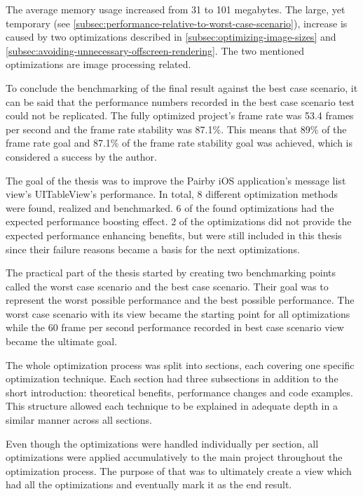 \documentclass[a4paper,12pt]{article}
\begin{document}
The average memory usage increased from 31 to 101 megabytes. The large, yet temporary (see \autoref{subsec:performance-relative-to-worst-case-scenario}), increase is caused by two optimizations described in \autoref{subsec:optimizing-image-sizes} and \autoref{subsec:avoiding-unnecessary-offscreen-rendering}. The two mentioned optimizations are image processing related.

To conclude the benchmarking of the final result against the best case scenario, it can be said that the performance numbers recorded in the best case scenario test could not be replicated. The fully optimized project's frame rate was 53.4 frames per second and the frame rate stability was 87.1\%. This means that 89\% of the frame rate goal and 87.1\% of the frame rate stability goal was achieved, which is considered a success by the author.

The goal of the thesis was to improve the Pairby iOS application's message list view's UITableView's performance. In total, 8 different optimization methods were found, realized and benchmarked. 6 of the found optimizations had the expected performance boosting effect. 2 of the optimizations did not provide the expected performance enhancing benefits, but were still included in this thesis since their failure reasons became a basis for the next optimizations.

The practical part of the thesis started by creating two benchmarking points called the worst case scenario and the best case scenario. Their goal was to represent the worst possible performance and the best possible performance. The worst case scenario with its  view became the starting point for all optimizations while the 60 frame per second performance recorded in best case scenario view became the ultimate goal.

The whole optimization process was split into sections, each covering one specific optimization technique. Each section had three subsections in addition to the short introduction: theoretical benefits, performance changes and code examples. This structure allowed each technique to be explained in adequate depth in a similar manner across all sections.

Even though the optimizations were handled individually per section, all optimizations were applied accumulatively to the main project throughout the optimization process. The purpose of that was to ultimately create a view which had all the optimizations and eventually mark it as the end result.
\end{document}
